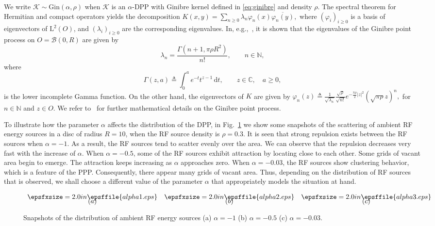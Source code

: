 \documentclass[12pt,draftclsnofoot,onecolumn]{IEEEtran}
\begin{document}
 We write $\mathcal{K}\sim\mathrm{Gin}(\alpha,\rho)$ 
 when $\mathcal{K}$ is an $\alpha$-DPP with Ginibre
 kernel defined in \eqref{eq:ginibre} and density $\rho$. 
The spectral theorem for Hermitian and compact operators 
 yields the decomposition 
$
K(x,y)=\sum_{n\ge 0} \lambda_n \varphi_n(x)\overline{\varphi_n(y)},
$
where $(\varphi_i)_{i\ge 0}$ is a basis of eigenvectors of $\mathrm{L}^2(O)$, and $(\lambda_i)_{i\ge 0}$ are the corresponding eigenvalues. 
In, e.g.,~\cite{DecreusefondFlintVergne}, it is shown that
 the eigenvalues of the Ginibre point process on $O=\mathcal{B}(0,R)$ 
 are given by 
\begin{equation}
\label{eq:eigenvalues}
\lambda_n = \frac{\Gamma(n+1, \pi\rho R^2)}{n!},\qquad n\in\mathbb N,
\end{equation}
 where 
\begin{equation}
\label{eq:defgamma}
\Gamma(z,a) \triangleq \int_0^a e^{-t} t^{z-1}\,\mathrm{d}t, 
\qquad 
z \in \mathbb{C}, \quad a \ge 0, 
\end{equation}
 is the lower incomplete Gamma function. 
 On the other hand, the eigenvectors of $K$ are given by
$
\varphi_n(z) \triangleq  \frac{1}{\sqrt{\lambda_n}}\frac{\sqrt{\rho}}{\sqrt{ n!}} e^{-\frac{\pi\rho}{2} | z |^2} (\sqrt{\pi\rho} z)^n, 
$
for $n\in\mathbb N$ and $z\in O$.
We refer to~\cite{DecreusefondFlintVergne} for 
further mathematical details on the Ginibre point process. 

To illustrate how the parameter $\alpha$ affects the distribution of the DPP, in Fig.~\ref{Distribution} we show some snapshots of the scattering of ambient RF energy sources in a disc of radius $R=10$, when the RF source density is $\rho=0.3$. It is seen that strong repulsion exists between the RF sources when $\alpha=-1$. As a result, the RF sources tend to scatter evenly over the area. We can observe that the repulsion decreases very fast with the increase of $\alpha$. When $\alpha=-0.5$, some of the RF sources exhibit attraction by locating close to each other. Some grids of vacant area begin to emerge. The attraction
keeps increasing as $\alpha$ approaches zero. When $\alpha=-0.03$, the RF sources show clustering behavior, which is a feature of the PPP. Consequently, there appear many grids of vacant area. Thus, depending on the distribution of RF sources that is observed, we shall choose a different value of the parameter $\alpha$ that appropriately models the situation at hand. 

\begin{figure*}[t]
\begin{center}
$\begin{array}{ccc} 
\epsfxsize=2.0 in \epsffile{alpha1.eps}	&
\epsfxsize=2.0 in \epsffile{alpha2.eps}	&
\epsfxsize=2.0 in \epsffile{alpha3.eps}	\\ [-0.2cm]
(a)	& (b)	&	(c)
\end{array}$
\caption{Snapshots of the distribution of ambient RF energy sources (a) $\alpha=-1$ (b) $\alpha=-0.5$ (c) $\alpha=-0.03$.}
\label{Distribution}
\end{center}
\end{figure*} 
\end{document}

